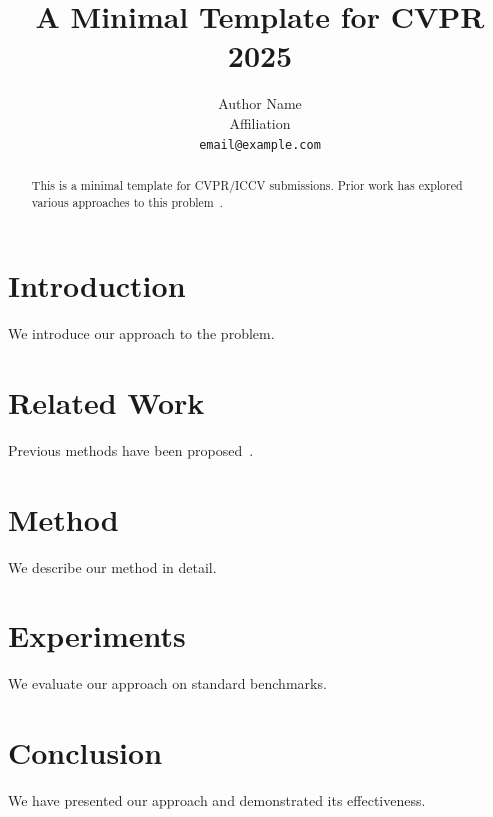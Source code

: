 \documentclass[10pt,twocolumn,letterpaper]{article}
\title{A Minimal Template for CVPR 2025}
\author{
  Author Name \\
  Affiliation \\
  {\tt\small email@example.com}
}
\begin{document}
\maketitle

\begin{abstract}
This is a minimal template for CVPR/ICCV submissions.
Prior work has explored various approaches to this problem~\cite{example2024}.
\end{abstract}

\section{Introduction}
We introduce our approach to the problem.

\section{Related Work}
Previous methods have been proposed~\cite{example2024}.

\section{Method}
We describe our method in detail.

\section{Experiments}
We evaluate our approach on standard benchmarks.

\section{Conclusion}
We have presented our approach and demonstrated its effectiveness.

{\small


}
\end{document}
